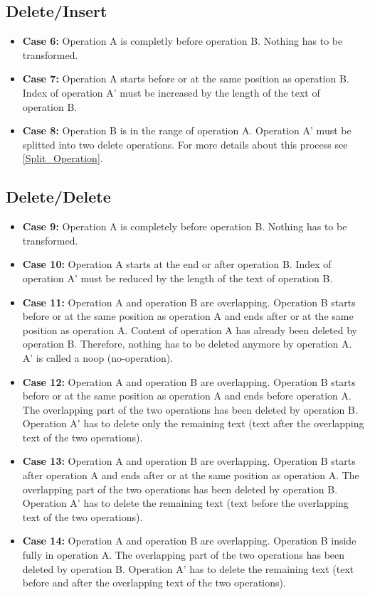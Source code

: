 \subsection{Delete/Insert}
\begin{itemize}
\item \textbf{Case 6:}
Operation A is completly before operation B. Nothing has to be transformed.
\item \textbf{Case 7:}
Operation A starts before or at the same position as operation B. Index of operation A' must be increased by the length of the text of operation B.
\item \textbf{Case 8:}
Operation B is in the range of operation A. Operation A' must be splitted into two delete operations. For more details about this process see \ref{Split_Operation}.
\end{itemize}

\subsection{Delete/Delete}
\begin{itemize}
\item \textbf{Case 9:}
Operation A is completely before operation B. Nothing has to be transformed.
\item \textbf{Case 10:}
Operation A starts at the end or after operation B. Index of operation A' must be reduced by the length of the text of operation B.
\item \textbf{Case 11:}
Operation A and operation B are overlapping. Operation B starts before or at the same position as operation A and ends after or at the same position as operation A. Content of operation A has already been deleted by operation B. Therefore, nothing has to be deleted anymore by operation A. A' is called a noop (no-operation).
\item \textbf{Case 12:}
Operation A and operation B are overlapping. Operation B starts before or at the same position as operation A and ends before operation A. The overlapping part of the two operations has been deleted by operation B. Operation A' has to delete only the remaining text (text after the overlapping text of the two operations).
\item \textbf{Case 13:}
Operation A and operation B are overlapping. Operation B starts after operation A and ends after or at the same position as operation A. The overlapping part of the two operations has been deleted by operation B. Operation A' has to delete the remaining text (text before the overlapping text of the two operations).
\item \textbf{Case 14:}
Operation A and operation B are overlapping. Operation B inside fully in operation A. The overlapping part of the two operations has been deleted by operation B. Operation A' has to delete the remaining text (text before and after the overlapping text of the two operations).
\end{itemize}



